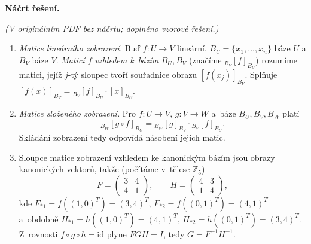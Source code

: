 \medskip
\noindent\textbf{Náčrt řešení.}\par
\textit{(V originálním PDF bez náčrtu; doplněno vzorové řešení.)}
\begin{enumerate}
  \item \textit{Matice lineárního zobrazení.} Buď $f:U\to V$ lineární, $B_U=\{x_1,\dots,x_n\}$ báze $U$ a $B_V$ báze $V$. \emph{Maticí $f$ vzhledem k~bázím} $B_U,B_V$ (značíme ${}_{B_V}[f]_{B_U}$) rozumíme matici, jejíž $j$-tý sloupec tvoří souřadnice obrazu $[f(x_j)]_{B_V}$. Splňuje $[f(x)]_{B_V}={}_{B_V}[f]_{B_U}\cdot[x]_{B_U}$.
  \item \textit{Matice složeného zobrazení.} Pro $f:U\to V$, $g:V\to W$ a~báze $B_U,B_V,B_W$ platí
    \[
      {}_{B_W}[g\circ f]_{B_U}={}_{B_W}[g]_{B_V}\cdot{}_{B_V}[f]_{B_U}.
    \]
    Skládání zobrazení tedy odpovídá násobení jejich matic.
  \item Sloupce matice zobrazení vzhledem ke kanonickým bázím jsou obrazy kanonických vektorů, takže (počítáme v~tělese $\mathbb{Z}_5$)
    \[
      F=\begin{pmatrix}3&4\\4&1\end{pmatrix},\qquad H=\begin{pmatrix}4&3\\1&4\end{pmatrix},
    \]
    kde $F_{*1}=f((1,0)^T)=(3,4)^T$, $F_{*2}=f((0,1)^T)=(4,1)^T$ a~obdobně $H_{*1}=h((1,0)^T)=(4,1)^T$, $H_{*2}=h((0,1)^T)=(3,4)^T$. Z~rovnosti $f\circ g\circ h=\mathrm{id}$ plyne $FGH=I$, tedy $G=F^{-1}H^{-1}$.


\end{enumerate}
